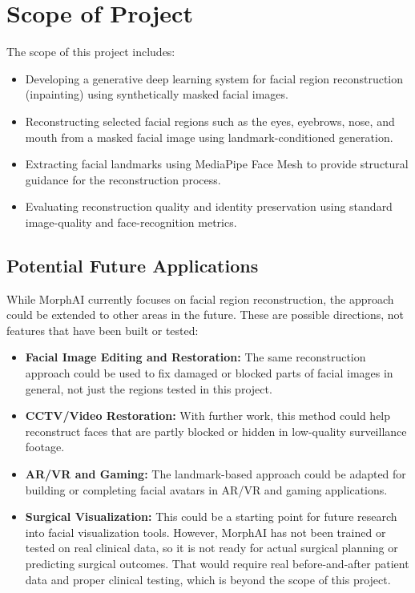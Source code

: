 \section{Scope of Project}
The scope of this project includes:
\begin{itemize}
    \item Developing a generative deep learning system for facial region reconstruction (inpainting) using synthetically masked facial images.
    
    \item Reconstructing selected facial regions such as the eyes, eyebrows, nose, and mouth from a masked facial image using landmark-conditioned generation.
    
    \item Extracting facial landmarks using MediaPipe Face Mesh to provide structural guidance for the reconstruction process.
    
    \item Evaluating reconstruction quality and identity preservation using standard image-quality and face-recognition metrics.
\end{itemize}

\subsection*{Potential Future Applications}
While MorphAI currently focuses on facial region reconstruction, the approach could be 
extended to other areas in the future. These are possible directions, not features that 
have been built or tested:

\begin{itemize}
    \item \textbf{Facial Image Editing and Restoration:} The same reconstruction approach 
    could be used to fix damaged or blocked parts of facial images in general, not just 
    the regions tested in this project.
    
    \item \textbf{CCTV/Video Restoration:} With further work, this method could help 
    reconstruct faces that are partly blocked or hidden in low-quality surveillance footage.
    
    \item \textbf{AR/VR and Gaming:} The landmark-based approach could be adapted for 
    building or completing facial avatars in AR/VR and gaming applications.
    
    \item \textbf{Surgical Visualization:} This could be a starting point for future 
    research into facial visualization tools. However, MorphAI has not been trained or 
    tested on real clinical data, so it is not ready for actual surgical planning or 
    predicting surgical outcomes. That would require real before-and-after patient data 
    and proper clinical testing, which is beyond the scope of this project.
\end{itemize}

    
    